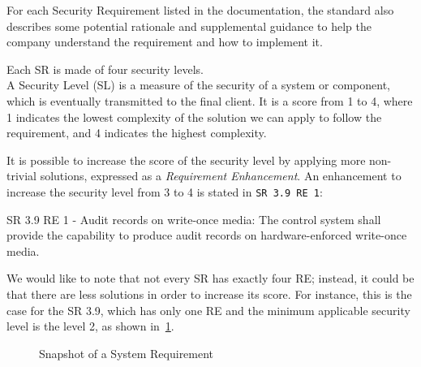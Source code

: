 For each Security Requirement listed in the documentation, the standard also describes some potential rationale and supplemental guidance to help the company understand the requirement and how to implement it.

Each SR is made of four security levels. \\
A Security Level (SL) is a measure of the security of a system or component, which is eventually transmitted to the final client. It is a score from 1 to 4, where 1 indicates the lowest complexity of the solution we can apply to follow the requirement, and 4 indicates the highest complexity.~\cite{ixon-practical-guide-iec-62443}

It is possible to increase the score of the security level by applying more non-trivial solutions, expressed as a \textit{Requirement Enhancement}. An enhancement to increase the security level from 3 to 4 is stated in \texttt{SR 3.9 RE 1}:
\begin{mdframed}
  SR 3.9 RE 1 - Audit records on write-once media: The control system shall provide the capability to produce audit records on hardware-enforced write-once media.
\end{mdframed}\label{sr:3-3_3-9_re1}

We would like to note that not every SR has exactly four RE; instead, it could be that there are less solutions in order to increase its score. For instance, this is the case for the SR 3.9, which has only one RE and the minimum applicable security level is the level 2, as shown in~\cref{fig:iec62443_3-3_3_9}.

\begin{figure}[t]
  \centering
  \caption[Snapshot of a System Requirement]{Snapshot of a System Requirement}
  \label{fig:iec62443_3-3_3_9}
\end{figure}

